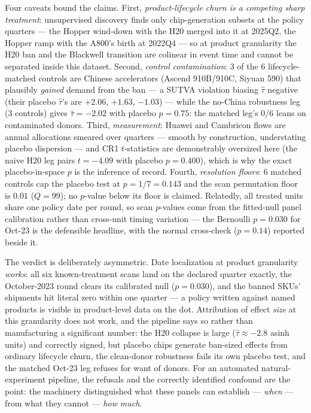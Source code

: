 \documentclass[11pt]{article}
\begin{document}
Four caveats bound the claims. First, \emph{product-lifecycle churn is a
competing sharp treatment}: unsupervised discovery finds only
chip-generation subsets at the policy quarters --- the Hopper wind-down with
the H20 merged into it at 2025Q2, the Hopper ramp with the A800's birth at
2022Q4 --- so at product granularity the H20 ban and the Blackwell
transition are colinear in event time and cannot be separated inside this
dataset. Second, \emph{control contamination}: 3 of the 6 lifecycle-matched
controls are Chinese accelerators (Ascend 910B/910C, Siyuan 590) that
plausibly \emph{gained} demand from the ban --- a SUTVA violation biasing
$\hat\tau$ negative (their placebo $\hat\tau$'s are $+2.06$, $+1.63$,
$-1.03$) --- while the no-China robustness leg (3 controls) gives
$\hat\tau=-2.02$ with placebo $p=0.75$: the matched leg's 0/6 leans on
contaminated donors. Third, \emph{measurement}: Huawei and Cambricon flows
are annual allocations smeared over quarters --- smooth by construction,
understating placebo dispersion --- and CR1 $t$-statistics are demonstrably
oversized here (the naive H20 leg pairs $t=-4.09$ with placebo $p=0.400$),
which is why the exact placebo-in-space $p$ is the inference of record.
Fourth, \emph{resolution floors}: 6 matched controls cap the placebo test at
$p=1/7=0.143$ and the scan permutation floor is $0.01$ ($Q=99$); no $p$-value
below its floor is claimed. Relatedly, all treated units share one policy
date per round, so scan $p$-values come from the fitted-null panel
calibration rather than cross-unit timing variation --- the Bernoulli
$p=0.030$ for Oct-23 is the defensible headline, with the normal cross-check
($p=0.14$) reported beside it.

The verdict is deliberately asymmetric. Date localization at product
granularity \emph{works}: all six known-treatment scans land on the declared
quarter exactly, the October-2023 round clears its calibrated null
($p=0.030$), and the banned SKUs' shipments hit literal zero within one
quarter --- a policy written against named products is visible in
product-level data on the dot. Attribution of effect \emph{size} at this
granularity does not work, and the pipeline says so rather than
manufacturing a significant number: the H20 collapse is large
($\hat\tau\approx -2.8$ asinh units) and correctly signed, but placebo chips
generate ban-sized effects from ordinary lifecycle churn, the clean-donor
robustness fails its own placebo test, and the matched Oct-23 leg refuses
for want of donors. For an automated natural-experiment pipeline, the
refusals and the correctly identified confound are the point: the machinery
distinguished what these panels can establish --- \emph{when} --- from what
they cannot --- \emph{how much}.
\end{document}
